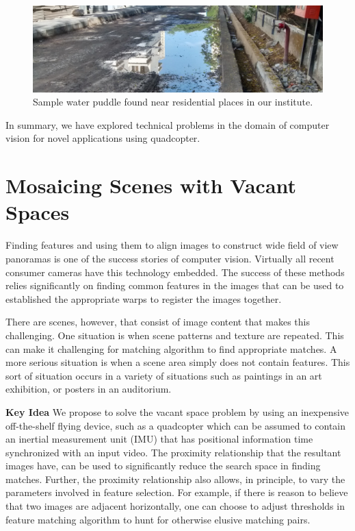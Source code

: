 \documentclass[11pt]{article}
\begin{document}
\begin{figure}
 \centering
  \includegraphics[width=\linewidth]{IMG_20150302_160349385_HDR.jpg}
  \caption{Sample water puddle found near residential places in our institute.}
  \label{fig:puddle}
\end{figure}
 
In summary, we have explored technical problems in the domain of computer
vision for novel applications using quadcopter.

\section{Mosaicing Scenes with Vacant Spaces}

Finding features and using them to align images to construct wide field
of view panoramas is one of the success stories of
computer vision.  Virtually all recent consumer cameras have this
technology embedded.  The success of these methods relies significantly on
finding common features in the images that can be used to established the
 appropriate warps to register the images together.

There are scenes, however, that consist of image content that makes this
challenging.  One situation is when scene patterns and texture are repeated.  
This can make it challenging for matching algorithm to find appropriate matches.
A more serious situation is when a scene area simply
does not contain features.  This sort of situation occurs in a variety
of situations such as paintings in an art exhibition, or posters in an
auditorium.

{\bf Key Idea} We propose to solve the vacant space problem by using
an inexpensive off-the-shelf flying device, such as a quadcopter which
can be assumed to contain an inertial measurement unit (IMU) that has
positional information time synchronized with an input video.  The
proximity relationship that the resultant images have, can be used to
significantly reduce the search space in finding matches.  Further,
the proximity relationship also allows, in principle, to vary the
parameters involved in feature selection. For example, if there is
reason to believe that two images are adjacent horizontally, one can
choose to adjust thresholds in feature matching algorithm to hunt for
otherwise elusive matching pairs.
\end{document}
